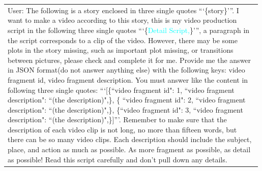 \begin{table}[h!]\centering
    \begin{minipage}{0.98\linewidth}\vspace{0mm}    
    \centering
    \begin{tcolorbox} 
        \centering
        \begin{tabular}{p{0.99\linewidth}}
        \begin{minipage}{0.99\linewidth}
User: The following is a story enclosed in three single quotes ```\{\textcolor[RGB]{243, 156, 18}{story}\}'''. I want to make a video according to this story, this is my video production script in the following three single quotes ```\{\textcolor{cyan}{Detail Script,}\}''', a paragraph in the script corresponds to a clip of the video. However, there may be some plots in the story missing, such as important plot missing, or transitions between pictures, please check and complete it for me. Provide me the answer in JSON format(do not answer anything else) with the following keys: video fragment id, video fragment description. You must answer like the content in following three single quotes: ```[\{``video fragment id": 1, ``video fragment description": ``(the description)",\}, \{ ``video fragment id": 2, ``video fragment description": ``(the description)",\}, \{``video fragment id": 3, ``video fragment description": ``(the description)",\}]'''. Remember to make sure that the description of each video clip is not long, no more than fifteen words, but there can be so many video clips. Each description should include the subject, place, and action as much as possible. As more fragment as possible, as detail as possible! Read this script carefully and don't pull down any details.


\end{minipage}
\end{tabular}
\end{tcolorbox}
\end{minipage}
\end{table}
